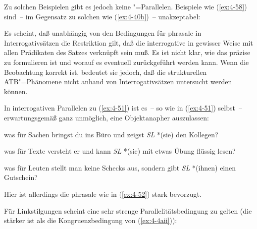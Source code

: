 \documentclass[output=paper]{langsci/langscibook}
\begin{document}
Zu solchen Beispielen gibt es jedoch keine "=Parallelen. Beispiele wie (\ref{ex:4-58}) sind~-- im Gegensatz zu solchen wie (\ref{ex:4-40b})~-- unakzeptabel:
\begin{exe}
\ex
\label{ex:4-58}
\begin{xlist}
\end{xlist}
\end{exe}
Es scheint, daß unabhängig von den Bedingungen für phrasale  in Interrogativsätzen die Restriktion gilt, daß die interrogative  in gewisser Weise mit allen Prädikaten des Satzes verknüpft sein muß. Es ist nicht klar, wie das präzise zu formulieren ist und worauf es eventuell zurückgeführt werden kann. Wenn die Beobachtung korrekt ist, bedeutet sie jedoch, daß die strukturellen ATB"=Phänomene nicht anhand von Interrogativsätzen untersucht werden können.

In interrogativen Parallelen zu (\ref{ex:4-51}) ist es~-- so wie in (\ref{ex:4-51}) selbst~-- erwartungsgemäß ganz unmöglich, eine Objektanapher auszulassen:

\begin{exe}
\ex
\label{ex:4-59}
\begin{xlist}
\ex%
\label{ex:4-59a}
was für Sachen bringst du ins Büro und zeigst \textit{SL} *(sie) den Kollegen?

\ex%
\label{ex:4-59b}
was für Texte versteht er und kann \textit{SL} *(sie) mit etwas Übung flüssig lesen?

\ex%
\label{ex:4-59c}
was für Leuten stellt man keine Schecks aus, sondern gibt \textit{SL} *(ihnen) einen Gutschein?
\end{xlist}
\end{exe}
Hier ist allerdings die phrasale  wie in (\ref{ex:4-52}) stark bevorzugt.

\ssubsection{}%
\label{subsec:4-3-4}
Für Linkstilgungen scheint eine sehr strenge Parallelitätsbedingung zu gelten (die stärker ist als die Kongruenzbedingung von (\ref{ex:4-4aii})):
\end{document}
